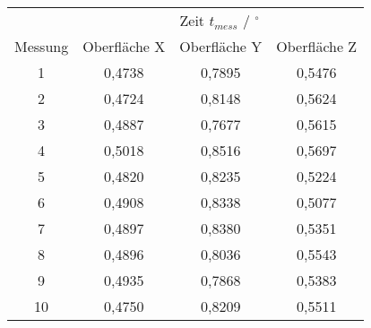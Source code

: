 \begin{tabular}{c|c|c|c}
    \space & \multicolumn{3}{c}{Zeit $t_{mess}$ / $^\circ$} \\
    Messung & Oberfläche X & Oberfläche Y & Oberfläche Z \\ \hline
    1 & 0,4738 & 0,7895 & 0,5476 \\
    2 & 0,4724 & 0,8148 & 0,5624 \\
    3 & 0,4887 & 0,7677 & 0,5615 \\
    4 & 0,5018 & 0,8516 & 0,5697 \\
    5 & 0,4820 & 0,8235 & 0,5224 \\
    6 & 0,4908 & 0,8338 & 0,5077 \\ 
    7 & 0,4897 & 0,8380 & 0,5351 \\ 
    8 & 0,4896 & 0,8036 & 0,5543 \\
    9 & 0,4935 & 0,7868 & 0,5383 \\
    10 & 0,4750 & 0,8209 & 0,5511
\end{tabular}